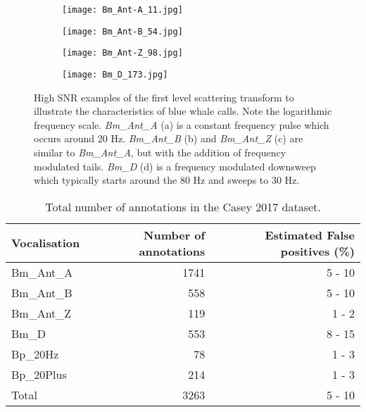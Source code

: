 {\begin{figure}
     \centering
     \begin{subfigure}[]{0.45\textwidth}
         \centering
         \texttt{[image: Bm\_Ant-A\_11.jpg]}
     \end{subfigure}
     \hfill
     \begin{subfigure}[]{0.45\textwidth}
         \centering
         \texttt{[image: Bm\_Ant-B\_54.jpg]}
     \end{subfigure}
     \hfill
     \begin{subfigure}[]{0.45\textwidth}
         \centering
         \texttt{[image: Bm\_Ant-Z\_98.jpg]}
     \end{subfigure}
     \hfill
     \begin{subfigure}[]{0.45\textwidth}
         \centering
         \texttt{[image: Bm\_D\_173.jpg]}
     \end{subfigure}
        \caption{High SNR examples of the first level scattering transform to illustrate the characteristics of blue whale calls. Note the logarithmic frequency scale.  \textit{Bm\_Ant\_A} (a) is a constant frequency pulse which occurs around 20 Hz. \textit{Bm\_Ant\_B} (b) and \textit{Bm\_Ant\_Z} (c) are similar to \textit{Bm\_Ant\_A}, but with the addition of frequency modulated tails. \textit{Bm\_D} (d) is a frequency modulated downsweep which typically starts around the 80 Hz and sweeps to 30 Hz.}
        \label{fig:Bm_Ex}
\end{figure}

\begin{table}[h!]
\caption{Total number of annotations in the Casey 2017 dataset.}
\label{tab:numannotations}
\begin{tabular}{lrr} 
\textbf{Vocalisation}      & \textbf{Number of annotations} & \textbf{Estimated False positives (\%)} \\ \hline
Bm\_Ant\_A & 1741  & 5 - 10               \\
Bm\_Ant\_B & 558  & 5 - 10                 \\
Bm\_Ant\_Z & 119    & 1 - 2               \\
Bm\_D      & 553     & 8 - 15              \\
Bp\_20Hz & 78        & 1 - 3             \\
Bp\_20Plus & 214     & 1 - 3               \\ 
Total & 3263 & 5 - 10\\ 
\end{tabular}
\end{table}

}
